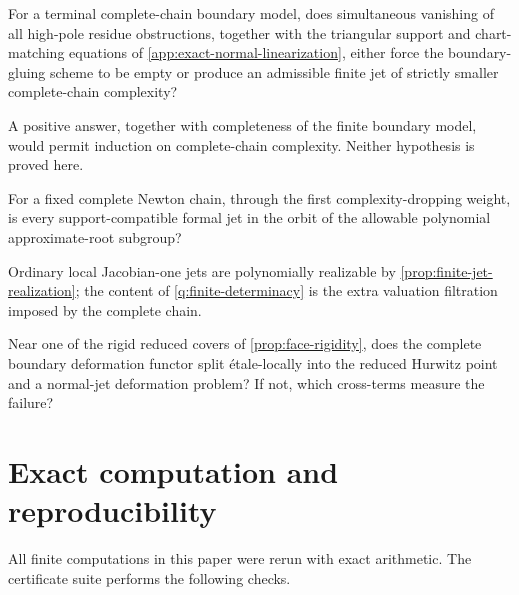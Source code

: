 \documentclass[11pt,reqno]{amsart}
\begin{document}
\begin{question}
\label{q:integrable}
For a terminal complete-chain boundary model, does simultaneous vanishing
of all high-pole residue obstructions, together with the triangular support
and chart-matching equations of
\cref{app:exact-normal-linearization}, either force the boundary-gluing
scheme to be empty or produce an admissible finite jet of strictly smaller
complete-chain complexity?
\end{question}

A positive answer, together with completeness of the finite boundary model,
would permit induction on complete-chain complexity.  Neither hypothesis is
proved here.

\begin{question}
\label{q:finite-determinacy}
For a fixed complete Newton chain, through the first
complexity-dropping weight, is every support-compatible formal jet in the
orbit of the allowable polynomial approximate-root subgroup?
\end{question}

Ordinary local Jacobian-one jets are polynomially realizable by
\cref{prop:finite-jet-realization}; the content of
\cref{q:finite-determinacy} is the extra valuation filtration imposed by
the complete chain.

\begin{question}
\label{q:splitting}
Near one of the rigid reduced covers of
\cref{prop:face-rigidity}, does the complete boundary deformation functor
split étale-locally into the reduced Hurwitz point and a normal-jet
deformation problem?  If not, which cross-terms measure the failure?
\end{question}

\section{Exact computation and reproducibility}
\label{sec:computation}

All finite computations in this paper were rerun with exact arithmetic.
The certificate suite performs the following checks.
\end{document}
